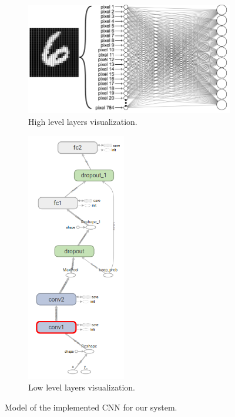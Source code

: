 		\begin{figure}[h]
			\centering
			\begin{subfigure}[h]{0.65\linewidth}
				\centering
				\includegraphics[width=4in]{images/mnist_net_example}
				\caption{High level layers visualization.}
			\end{subfigure}
			\begin{subfigure}[h]{0.3\linewidth}
				\centering
				\includegraphics[width=1.7in]{images/digitclassifier_network_graph}
				\caption{Low level layers visualization.}
			\end{subfigure}
			\caption{Model of the implemented CNN for our system.}
			\label{fig:4_digitclassifier_neural_structure}
		\end{figure}
		
